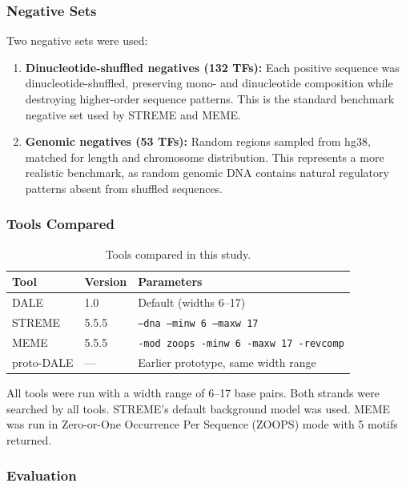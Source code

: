 \documentclass[11pt,a4paper]{article}
\begin{document}
\subsubsection{Negative Sets}

Two negative sets were used:

\begin{enumerate}
    \item \textbf{Dinucleotide-shuffled negatives (132 TFs):} Each positive sequence was dinucleotide-shuffled, preserving mono- and dinucleotide composition while destroying higher-order sequence patterns. This is the standard benchmark negative set used by STREME and MEME.
    
    \item \textbf{Genomic negatives (53 TFs):} Random regions sampled from hg38, matched for length and chromosome distribution. This represents a more realistic benchmark, as random genomic DNA contains natural regulatory patterns absent from shuffled sequences.
\end{enumerate}

\subsubsection{Tools Compared}

\begin{table}[H]
\centering
\caption{Tools compared in this study.}
\label{tab:tools}
\small
\begin{tabular}{lll}
\toprule
Tool & Version & Parameters \\
\midrule
DALE       & 1.0    & Default (widths 6--17) \\
STREME               & 5.5.5  & \texttt{--dna --minw 6 --maxw 17} \\
MEME                 & 5.5.5  & \texttt{-mod zoops -minw 6 -maxw 17 -revcomp} \\
proto-DALE & ---    & Earlier prototype, same width range \\
\bottomrule
\end{tabular}
\end{table}

All tools were run with a width range of 6--17 base pairs. Both strands were searched by all tools. STREME's default background model was used. MEME was run in Zero-or-One Occurrence Per Sequence (ZOOPS) mode with 5 motifs returned.

\subsubsection{Evaluation}
\end{document}
